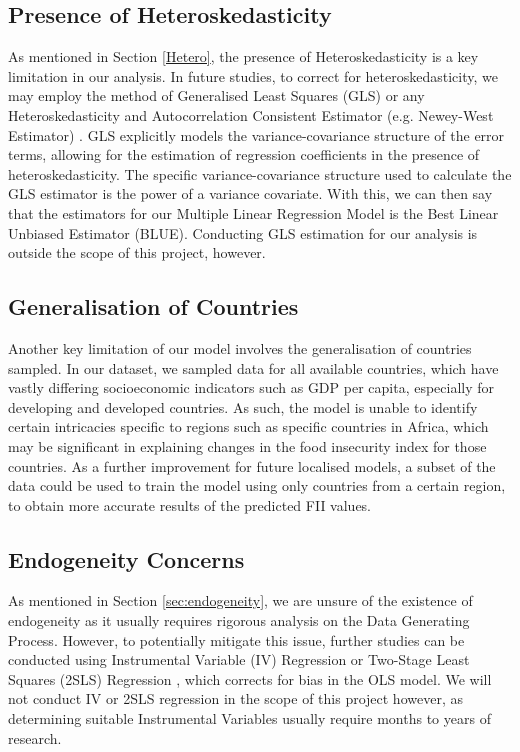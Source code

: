 \documentclass{article}
\begin{document}
\subsection{Presence of Heteroskedasticity}
As mentioned in Section \ref{Hetero}, the presence of Heteroskedasticity is a key limitation in our analysis. In future studies, to correct for heteroskedasticity, we may employ the method of Generalised Least Squares (GLS) \cite{GLS} or any Heteroskedasticity and Autocorrelation Consistent Estimator (e.g. Newey-West Estimator) \cite{HACestimator}. GLS explicitly models the variance-covariance structure of the error terms, allowing for the estimation of regression coefficients in the presence of heteroskedasticity. The specific variance-covariance structure used to calculate the GLS estimator is the power of a variance covariate. With this, we can then say that the estimators for our Multiple Linear Regression Model is the Best Linear Unbiased Estimator (BLUE). Conducting GLS estimation for our analysis is outside the scope of this project, however.

\subsection{Generalisation of Countries}
Another key limitation of our model involves the generalisation of countries sampled. In our dataset, we sampled data for all available countries, which have vastly differing socioeconomic indicators such as GDP per capita, especially for developing and developed countries. As such, the model is unable to identify certain intricacies specific to regions such as specific countries in Africa, which may be significant in explaining changes in the food insecurity index for those countries. As a further improvement for future localised models, a subset of the data could be used to train the model using only countries from a certain region, to obtain more accurate results of the predicted FII values.

\subsection{Endogeneity Concerns}
As mentioned in Section \ref{sec:endogeneity}, we are unsure of the existence of endogeneity as it usually requires rigorous analysis on the Data Generating Process. However, to potentially mitigate this issue, further studies can be conducted using Instrumental Variable (IV) Regression \cite{IVREG} or Two-Stage Least Squares (2SLS) Regression \cite{2SLS}, which corrects for bias in the OLS model. We will not conduct IV or 2SLS regression in the scope of this project however, as determining suitable Instrumental Variables usually require months to years of research. 
\end{document}
